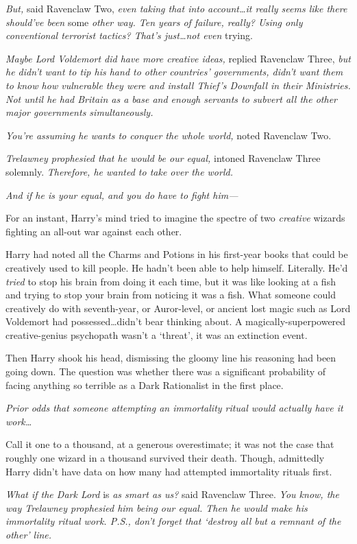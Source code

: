 \emph{But,} said Ravenclaw Two, \emph{even taking that into account…it really seems like there should’ve been} some \emph{other way. Ten years of failure, really? Using only conventional terrorist tactics? That’s just…not even} trying.

\emph{Maybe Lord Voldemort did have more creative ideas,} replied Ravenclaw Three, \emph{but he didn’t want to tip his hand to \emph{other} countries’ governments, didn’t want \emph{them} to know how vulnerable they were and install Thief’s Downfall in \emph{their} Ministries. Not until he had Britain as a base and enough servants to subvert \emph{all} the other major governments simultaneously.}

\emph{You’re assuming he wants to conquer the whole world,} noted Ravenclaw Two.

\emph{Trelawney prophesied that he would be our equal,} intoned Ravenclaw Three solemnly. \emph{Therefore, he wanted to take over the world.}

\emph{And if he is your equal, and you do have to fight him—}

For an instant, Harry’s mind tried to imagine the spectre of two \emph{creative} wizards fighting an all-out war against each other.

Harry had noted all the Charms and Potions in his first-year books that could be creatively used to kill people. He hadn’t been able to help himself. Literally. He’d \emph{tried} to stop his brain from doing it each time, but it was like looking at a fish and trying to stop your brain from noticing it was a fish. What someone could creatively do with seventh-year, or Auror-level, or ancient lost magic such as Lord Voldemort had possessed…didn’t bear thinking about. A magically-superpowered creative-genius psychopath wasn’t a ‘threat’, it was an extinction event.

Then Harry shook his head, dismissing the gloomy line his reasoning had been going down. The question was whether there was a significant probability of facing anything so terrible as a Dark Rationalist in the first place.

\emph{Prior odds that someone attempting an immortality ritual would actually have it work…}

Call it one to a thousand, at a generous overestimate; it was not the case that roughly one wizard in a thousand survived their death. Though, admittedly Harry didn’t have data on how many had attempted immortality rituals first.

\emph{What if the Dark Lord} is \emph{as smart as us?} said Ravenclaw Three. \emph{You know, the way Trelawney prophesied him being our \emph{equal.} Then he would \emph{make} his immortality ritual work. P.S., don’t forget that ‘destroy all but a remnant of the other’ line.}

